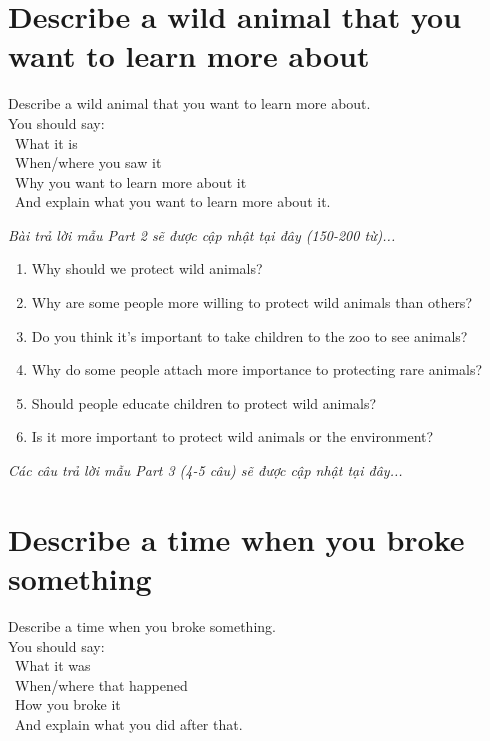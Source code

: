 \section{Describe a wild animal that you want to learn more about}
\begin{ieltsprompt}
Describe a wild animal that you want to learn more about. \\
You should say: \\
\textbullet\ What it is \\
\textbullet\ When/where you saw it \\
\textbullet\ Why you want to learn more about it \\
\textbullet\ And explain what you want to learn more about it. \\
\end{ieltsprompt}

\vspace{1em}
\textit{Bài trả lời mẫu Part 2 sẽ được cập nhật tại đây (150-200 từ)...}
\vspace{2em}

\begin{ieltsprompt}
\begin{enumerate}[itemsep=4pt]
    \item Why should we protect wild animals?
    \item Why are some people more willing to protect wild animals than others?
    \item Do you think it's important to take children to the zoo to see animals?
    \item Why do some people attach more importance to protecting rare animals?
    \item Should people educate children to protect wild animals?
    \item Is it more important to protect wild animals or the environment?
\end{enumerate}
\end{ieltsprompt}

\vspace{1em}
\textit{Các câu trả lời mẫu Part 3 (4-5 câu) sẽ được cập nhật tại đây...}
\vspace{2em}

\section{Describe a time when you broke something}
\begin{ieltsprompt}
Describe a time when you broke something. \\
You should say: \\
\textbullet\ What it was \\
\textbullet\ When/where that happened \\
\textbullet\ How you broke it \\
\textbullet\ And explain what you did after that. \\
\end{ieltsprompt}


